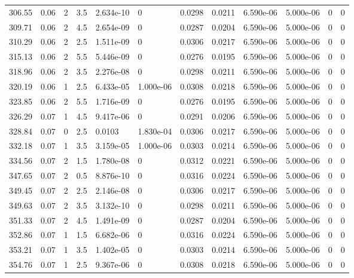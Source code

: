 \documentclass[preview]{standalone}
\begin{document}
{{{{\begin{tabular}{L{1.2cm}C{1.2cm} C{0.3cm}C{0.5cm} C{1.4cm}C{1.4cm} C{1.4cm}C{1.4cm} C{1.6cm}C{1.6cm} C{1.6cm}C{1.6cm}}
  306.55  &  0.06  & 2     & 3.5 &  2.634e-10  & 0  &  0.0298&   0.0211& 6.590e-06 & 5.000e-06   &  0 & 0  \\ 
  309.71  &  0.06  & 2     & 4.5 &  2.654e-09  & 0  &  0.0287&   0.0204& 6.590e-06 & 5.000e-06   &  0 & 0  \\ 
  310.29  &  0.06  & 2     & 2.5 &  1.511e-09  & 0  &  0.0306&   0.0217& 6.590e-06 & 5.000e-06   &  0 & 0  \\ 
  315.13  &  0.06  & 2     & 5.5 &  5.446e-09  & 0  &  0.0276&   0.0195& 6.590e-06 & 5.000e-06   &  0 & 0  \\ 
  318.96  &  0.06  & 2     & 3.5 &  2.276e-08  & 0  &  0.0298&   0.0211& 6.590e-06 & 5.000e-06   &  0 & 0  \\ 
  320.19  &  0.06  & 1     & 2.5 &  6.433e-05  & 1.000e-06  &  0.0308&   0.0218& 6.590e-06 & 5.000e-06   &  0 & 0  \\ 
  323.85  &  0.06  & 2     & 5.5 &  1.716e-09  & 0  &  0.0276&   0.0195& 6.590e-06 & 5.000e-06   &  0 & 0  \\ 
  326.29  &  0.07  & 1     & 4.5 &  9.417e-06  & 0  &  0.0291&   0.0206& 6.590e-06 & 5.000e-06   &  0 & 0  \\ 
  328.84  &  0.07  & 0     & 2.5 &  0.0103  & 1.830e-04  &  0.0306&   0.0217& 6.590e-06 & 5.000e-06   &  0 & 0  \\ 
  332.18  &  0.07  & 1     & 3.5 &  3.159e-05  & 1.000e-06  &  0.0303&   0.0214& 6.590e-06 & 5.000e-06   &  0 & 0  \\ 
  334.56  &  0.07  & 2     & 1.5 &  1.780e-08  & 0  &  0.0312&   0.0221& 6.590e-06 & 5.000e-06   &  0 & 0  \\ 
  347.65  &  0.07  & 2     & 0.5 &  8.876e-10  & 0  &  0.0316&   0.0224& 6.590e-06 & 5.000e-06   &  0 & 0  \\ 
  349.45  &  0.07  & 2     & 2.5 &  2.146e-08  & 0  &  0.0306&   0.0217& 6.590e-06 & 5.000e-06   &  0 & 0  \\ 
  349.63  &  0.07  & 2     & 3.5 &  3.132e-10  & 0  &  0.0298&   0.0211& 6.590e-06 & 5.000e-06   &  0 & 0  \\ 
  351.33  &  0.07  & 2     & 4.5 &  1.491e-09  & 0  &  0.0287&   0.0204& 6.590e-06 & 5.000e-06   &  0 & 0  \\ 
  352.86  &  0.07  & 1     & 1.5 &  6.682e-06  & 0  &  0.0316&   0.0224& 6.590e-06 & 5.000e-06   &  0 & 0  \\ 
  353.21  &  0.07  & 1     & 3.5 &  1.402e-05  & 0  &  0.0303&   0.0214& 6.590e-06 & 5.000e-06   &  0 & 0  \\ 
  354.76  &  0.07  & 1     & 2.5 &  9.367e-06  & 0  &  0.0308&   0.0218& 6.590e-06 & 5.000e-06   &  0 & 0  \\ 

\end{tabular}}}}}
\end{document}
